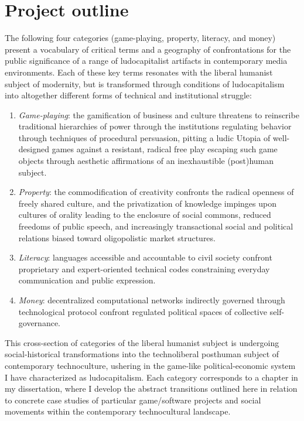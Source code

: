 \section*{Project outline}
The following four categories (game-playing, property, literacy, and money) present a vocabulary of critical terms and a geography of confrontations for the public significance of a range of ludocapitalist artifacts in contemporary media environments. Each of these key terms resonates with the liberal humanist subject of modernity, but is transformed through conditions of ludocapitalism into altogether different forms of technical and institutional struggle:

\begin{enumerate}
  \item{
    \emph{Game-playing}: the gamification of business and culture threatens to reinscribe traditional hierarchies of power through the institutions regulating behavior through techniques of procedural persuasion, pitting a ludic Utopia of well-designed games against a resistant, radical free play escaping such game objects through aesthetic affirmations of an inexhaustible (post)human subject.
    }
  \item{
    \emph{Property}: the commodification of creativity confronts the radical openness of freely shared culture, and the privatization of knowledge impinges upon cultures of orality leading to the enclosure of social commons, reduced freedoms of public speech, and increasingly transactional social and political relations biased toward oligopolistic market structures.
    }
  \item{
    \emph{Literacy}: languages accessible and accountable to civil society confront proprietary and expert-oriented technical codes constraining everyday communication and public expression.
    }
  \item{
    \emph{Money}: decentralized computational networks indirectly governed through technological protocol confront regulated political spaces of collective self-governance.
    }
\end{enumerate}

This cross-section of categories of the liberal humanist subject is undergoing social-historical transformations into the technoliberal posthuman subject of contemporary technoculture, ushering in the game-like political-economic system I have characterized as ludocapitalism. Each category corresponds to a chapter in my dissertation, where I develop the abstract transitions outlined here in relation to concrete case studies of particular game/software projects and social movements within the contemporary technocultural landscape.

